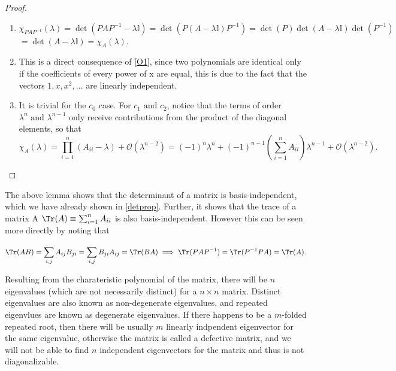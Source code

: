 \documentclass[a4paper,12pt]{report}
\begin{document}

\begin{proof}
\begin{enumerate}[label=(\(O\)\arabic*)] 
    \item \(\chi _{PAP^{-1} }(\lambda ) = \det (PAP^{-1} - \lambda \mathbb{I}) = \det (P(A-\lambda \mathbb{I})P^{-1} ) = \det (P)\det (A-\lambda \mathbb{I}) \det (P^{-1} )\) \(= \det (A - \lambda \mathbb{I}) = \chi _{A}(\lambda )  \).
    \item This is a direct consequence of \cref{O1}, since two polynomials are identical only if the coefficients of every power of x are equal, this is due to the fact that the vectors \(1, x, x^2, \ldots \) are linearly independent.
    \item It is trivial for the \(c_0 \) case. For \(c_1 \text { and } c_2 \), notice that the terms of order \(\lambda ^{n} \text { and } \lambda ^{n-1} \) only receive contributions from the product of the diagonal elements, so that
    \begin{equation}
        \chi _{A}(\lambda ) =   \prod_{i=1}^{n} (A_{ii} - \lambda  ) + \mathcal{O}(\lambda ^{n-2} ) = (-1)^{n} \lambda ^{n} + (-1)^{n-1} \left( \sum_{i=1}^{n} A_{ii}  \right) \lambda ^{n-1} + \mathcal{O}(\lambda ^{n-2} ).     
    \end{equation}
    
    
\end{enumerate}

\end{proof}

The above lemma shows that the determinant of a matrix is basis-independent, which we have already shown in \cref{detprop}. Further, it shows that the trace of a matrix A \(\Tr (A) \equiv \sum_{i=1}^{n} A_{ii}\) is also basis-independent. However this can be seen more directly by noting that 

\begin{equation}
    \Tr (AB) = \sum_{i,j}^{} A_{ij} B_{ji} = \sum_{i,j}^{} B_{ji} A_{ij} = \Tr (BA) \implies \Tr (PAP^{-1} ) = \Tr (P^{-1} PA) = \Tr (A).
\end{equation}

Resulting from the charateristic polynomial of the matrix, there will be \(n\) eigenvalues (which are not necessarily distinct) for a \(n \times n\) matrix. Distinct eigenvalues are also known as non-degenerate eigenvalues, and repeated eigenvlues are known as degenerate eigenvalues. If there happens to be a \(m\)-folded repeated root, then there will be usually \(m\) linearly indpendent eigenvector for the same eigenvalue, otherwise the matrix is called a defective matrix, and we will not be able to find \(n\) independent eigenvectors for the matrix and thus is not diagonalizable.
\end{document}
